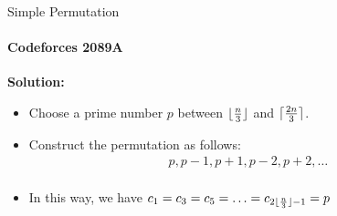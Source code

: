 \begin{frame}{Simple Permutation}
	\framesubtitle{Codeforces 2089A}
	\textbf{Solution:} \\
	\begin{itemize}
		\item <1-> Choose a prime number $p$ between $\floor{\frac{n}{3}}$ and $\ceil{\frac{2n}{3}}$.
		\item <2-> Construct the permutation as follows:
		      \begin{align*}
			      p, p - 1, p + 1, p - 2, p + 2, \ldots \\
		      \end{align*}
		\item <3-> In this way, we have $c_1 = c_3 = c_5 = \ldots = c_{2 \floor{\frac{n}{3}} - 1} = p$
	\end{itemize}
\end{frame}

